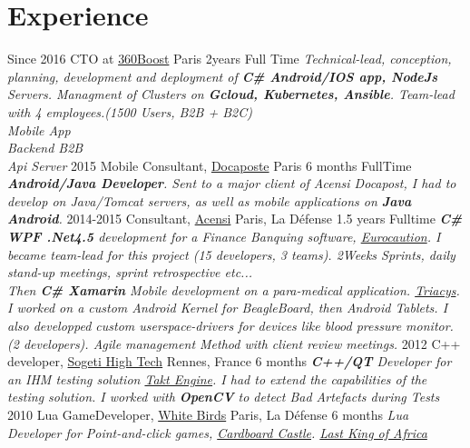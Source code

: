 \documentclass{emonides-cv}
\begin{document}
\section{Experience}
\begin{entrylist}
  \entry
    {Since  2016}
    {CTO at \href{https://360boost.com/}{360Boost}  {\normalfont Paris}}
    {2years Full Time}
    {\emph{Technical-lead, conception, planning, development and deployment of \textbf{C\# Android/IOS app, NodeJs} Servers.
     Managment of Clusters on \textbf{Gcloud, Kubernetes, Ansible}. Team-lead with 4 employees.(1500 Users, B2B + B2C)
    \\Mobile App
    \\Backend B2B
    \\Api Server}}
  \entry
    {2015}
    {Mobile Consultant, \href{https://www.docapost.com/en/}{Docaposte} {\normalfont Paris}}
    {6 months FullTime}
    {\emph{\textbf{Android/Java Developer}. Sent to a major client of Acensi Docapost, I had to develop on Java/Tomcat servers, as well as mobile applications on \textbf{Java Android}.}}
  \entry
    {2014-2015}
    {Consultant, \href{https://www.acensi.fr/}{Acensi} {\normalfont Paris, La Défense}}
    {1.5 years Fulltime}
    {\emph{\textbf{C\# WPF .Net4.5} development for a Finance Banquing software, \href{https://www.eurocaution.net/}{Eurocaution}.
    I became team-lead for this project (15 developers, 3 teams). 2Weeks Sprints, daily stand-up meetings, sprint retrospective etc...
    \\Then \textbf{C\# Xamarin} Mobile development on a para-medical application. \href{http://www.triacys.com/}{Triacys}.
    I worked on a custom Android Kernel for BeagleBoard, then Android Tablets. I also developped custom userspace-drivers for devices like blood pressure monitor.
    (2 developers). Agile management Method with client review meetings. }}
  \entry
    {2012}
    {C++ developer, \href{https://www.acensi.fr/}{Sogeti High Tech} {\normalfont Rennes, France}}
    {6 months}
    {\emph{\textbf{C++/QT} Developer for an IHM testing solution \href{https://www.eurocaution.net/}{Takt Engine}.
    I had to extend the capabilities of the testing solution. I worked with \textbf{OpenCV} to detect Bad Artefacts during Tests }}
  \entry
    {2010}
    {Lua GameDeveloper, \href{https://www.giantbomb.com/white-birds-productions/3010-5637/}{White Birds} {\normalfont Paris, La Défense}}
    {6 months}
    {\emph{Lua Developer for Point-and-click games, \href{https://www.bigfishgames.com/games/6859/cardboard-castle/}{Cardboard Castle}. \href{https://www.wikiwand.com/fr/White_Birds_Productions}{Last King of Africa}}}
\end{entrylist}
\end{document}
